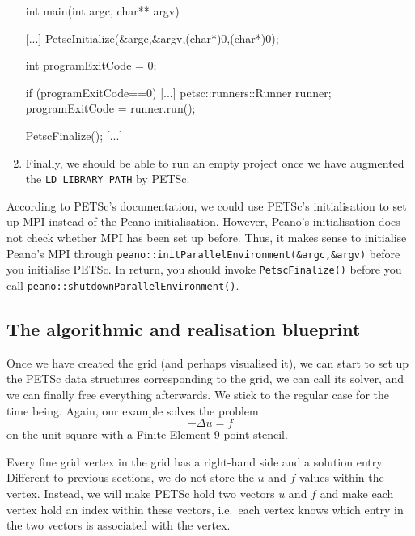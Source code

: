 \begin{enumerate}
\begin{code}
[...]

int main(int argc, char** argv) {
  [...]
  PetscInitialize(&argc,&argv,(char*)0,(char*)0);

  int programExitCode = 0;

  if (programExitCode==0) {
    [...]
    petsc::runners::Runner runner;
    programExitCode = runner.run();
  }

  PetscFinalize();
  [...]
}  
  \end{code}
  \item Finally, we should be able to run an empty project once we have
  augmented the \texttt{LD\_LIBRARY\_PATH} by PETSc.
\end{enumerate}
  

\begin{remark}
   According to PETSc's documentation, we could use PETSc's initialisation to
   set up MPI instead of the Peano initialisation. However, Peano's
   initialisation does not check whether MPI has been set up before. 
   Thus, it makes sense to initialise Peano's MPI through
   \texttt{peano::initParallelEnvironment(&argc,&argv)} before you initialise
   PETSc. In return, you should invoke \texttt{PetscFinalize()} before you call
   \texttt{peano::shutdownParallelEnvironment()}.
\end{remark}




\subsection{The algorithmic and realisation blueprint}

Once we have created the grid (and perhaps visualised it), we can start to set
up the PETSc data structures corresponding to the grid, we can call its solver,
and we can finally free everything afterwards.
We stick to the regular case for the time being.
Again, our example solves the problem
\[
-\Delta u = f
\]
on the unit square with a Finite Element 9-point stencil.


Every fine grid vertex in the grid has a right-hand side and a solution entry. 
Different to previous sections, we do not store the $u$ and $f$ values within
the vertex.
Instead, we will make PETSc hold two vectors $u$ and $f$ and
make each vertex hold an index within these vectors, i.e.~each vertex knows
which entry in the two vectors is associated with the vertex.


